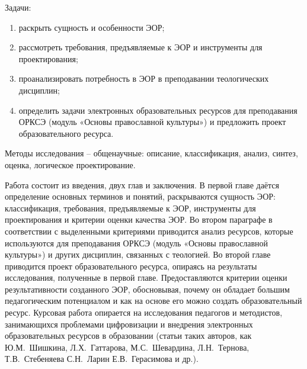 Задачи:
\begin{enumerate}
\item\label{task1} раскрыть сущность и особенности ЭОР;
\item\label{task2} рассмотреть требования, предъявляемые к ЭОР и инструменты для проектирования; 
\item\label{task3}  проанализировать потребность в ЭОР в преподавании теологических дисциплин;
\item\label{task4}  определить задачи электронных образовательных ресурсов для преподавания ОРКСЭ (модуль «Основы православной культуры») и предложить проект образовательного ресурса.

\end{enumerate}


Методы исследования – общенаучные: описание, классификация, анализ, синтез, оценка, логическое проектирование.

Работа состоит из введения, двух глав и заключения. В первой главе даётся определение основных терминов и понятий, раскрываются сущность ЭОР: классификация, требования, предъявляемые к ЭОР, инструменты для проектирования и критерии оценки качества ЭОР.
Во втором параграфе в соответствии с выделенными критериями приводится анализ ресурсов, которые используются для преподавания ОРКСЭ (модуль «Основы православной культуры») и других дисциплин, связанных с теологией. Во второй главе приводится проект образовательного ресурса, опираясь на результаты исследования, полученные в первой главе.
Предоставляются критерии оценки результативности созданного ЭОР, обосновывая, почему он обладает большим педагогическим потенциалом и как на основе его можно создать образовательный ресурс.
Курсовая работа опирается на исследования педагогов и методистов, занимающихся проблемами цифровизации и внедрения электронных образовательных ресурсов в образовании (статьи таких авторов, как Ю.М.~Шишкина, Л.Х.~Гаттарова, М.С.~Шевардина, Л.Н.~Тернова, Т.В.~Стебеняева С.Н.~Ларин Е.В.~Герасимова и др.).
